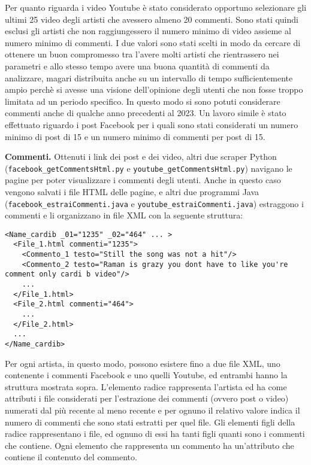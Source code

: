 \documentclass[conference]{IEEEtran}
\newcommand{\mypar}[1]{{\bf #1.}}
\begin{document}
Per quanto riguarda i video Youtube è stato considerato opportuno selezionare gli ultimi 25 video
degli artisti che avessero almeno 20 commenti. Sono stati quindi esclusi gli artisti che non raggiungessero
il numero minimo di video assieme al numero minimo di commenti. I due valori sono stati scelti in modo
da cercare di ottenere un buon compromesso tra l'avere molti artisti che rientrassero nei parametri e
allo stesso tempo avere una buona quantità di commenti da analizzare, magari distribuita anche su un
intervallo di tempo sufficientemente ampio perchè si avesse una visione dell'opinione degli utenti
che non fosse troppo limitata ad un periodo specifico. In questo modo si sono potuti considerare commenti
anche di qualche anno precedenti al 2023. Un lavoro simile è stato effettuato riguardo i post Facebook per
i quali sono stati considerati un numero minimo di post di 15 e un numero minimo di commenti per post di 15.

\mypar{Commenti} Ottenuti i link dei post e dei video, altri due scraper Python (\texttt{facebook\_getCommentsHtml.py}
e \texttt{youtube\_getCommentsHtml.py}) navigano le pagine per poter visualizzare i commenti degli utenti. Anche in
questo caso vengono salvati i file HTML delle pagine, e altri due programmi Java (\texttt{facebook\_estraiCommenti.java}
e \texttt{youtube\_estraiCommenti.java}) estraggono i commenti e li organizzano in file XML con la seguente
struttura:
\begin{lstlisting}
<Name_cardib _01="1235" _02="464" ... >
  <File_1.html commenti="1235">
    <Commento_1 testo="Still the song was not a hit"/>
    <Commento_2 testo="Raman is grazy you dont have to like you're comment only cardi b video"/>
    ...
  </File_1.html>
  <File_2.html commenti="464">
    ...
  </File_2.html>
  ...
</Name_cardib>
\end{lstlisting}
Per ogni artista, in questo modo, possono esistere fino a due file XML, uno contenente i commenti Facebook e uno quelli Youtube,
ed entrambi hanno la struttura mostrata sopra. L'elemento radice rappresenta l'artista ed ha come attributi
i file considerati per l'estrazione dei commenti (ovvero post o video) numerati dal più recente al meno recente
e per ognuno il relativo valore indica il numero di commenti che sono stati estratti per quel file. Gli elementi
figli della radice rappresentano i file, ed ognuno di essi ha tanti figli quanti sono i commenti che contiene. Ogni elemento
che rappresenta un commento ha un'attributo che contiene il contenuto del commento.
\end{document}

